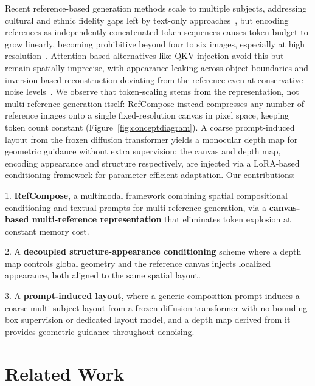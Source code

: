 Recent reference-based generation methods scale to multiple subjects, addressing cultural and ethnic fidelity gaps left by text-only approaches~\cite{wu2025uno,he2025dreamo,xiao2024omnigen,omnigen2_2025,wang2024instantid,li2024photomaker}, but encoding references as independently concatenated token sequences causes token budget to grow linearly, becoming prohibitive beyond four to six images, especially at high resolution~\cite{ye2023ip,wu2025uno,xverse2024,xiao2024omnigen,omnigen2_2025}. Attention-based alternatives like QKV injection avoid this but remain spatially imprecise, with appearance leaking across object boundaries and inversion-based reconstruction deviating from the reference even at conservative noise levels~\cite{hertz2022prompt,mokady2023null,tumanyan2023plug}. We observe that token-scaling stems from the representation, not multi-reference generation itself: RefCompose instead compresses any number of reference images onto a single fixed-resolution canvas in pixel space, keeping token count constant (Figure~\ref{fig:conceptdiagram}). A coarse prompt-induced layout from the frozen diffusion transformer yields a monocular depth map for geometric guidance without extra supervision; the canvas and depth map, encoding appearance and structure respectively, are injected via a LoRA-based conditioning framework for parameter-efficient adaptation. Our contributions:

1. \textbf{RefCompose}, a multimodal framework combining spatial compositional conditioning and textual prompts for multi-reference generation, via a \textbf{canvas-based multi-reference representation} that eliminates token explosion at constant memory cost.

2. A \textbf{decoupled structure-appearance conditioning} scheme where a depth map controls global geometry and the reference canvas injects localized appearance, both aligned to the same spatial layout.

3. A \textbf{prompt-induced layout}, where a generic composition prompt induces a coarse multi-subject layout from a frozen diffusion transformer with no bounding-box supervision or dedicated layout model, and a depth map derived from it provides geometric guidance throughout denoising.

\section{Related Work}
\label{sec:related}

